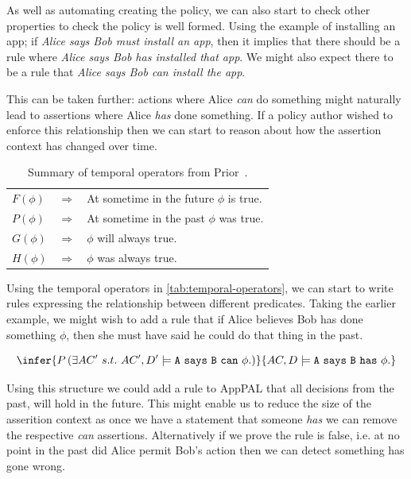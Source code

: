 \documentclass[thesis.tex]{subfiles}
\begin{document}
As well as automating creating the policy, we can also start to check other
properties to check the policy is well formed. Using the example of installing
an app; if \emph{Alice says Bob must install
  an app}, then it implies that there should be a rule where \emph{Alice says
Bob has installed that app}.  We might also expect there to be a rule that
\emph{Alice says Bob can install the app}.

This can be taken further: actions where Alice \emph{can} do something might
naturally lead to assertions where Alice \emph{has} done something.  If a policy
author wished to enforce this relationship then we can start to reason about how the
assertion context has changed over time.

\begin{table}\centering
  \begin{tabular}{l c l}
    \toprule
      $F(\phi)$ & $\Rightarrow$ & At sometime in the future $\phi$ is true. \\
      $P(\phi)$ & $\Rightarrow$ & At sometime in the past $\phi$ was true. \\
      $G(\phi)$ & $\Rightarrow$ & $\phi$ will always true. \\
      $H(\phi)$ & $\Rightarrow$ & $\phi$ was always true. \\
    \bottomrule
  \end{tabular}
  \caption{Summary of temporal operators from Prior~\cite{arthur_n._prior_past_1967}.}
  \label{tab:temporal-operators}
\end{table}

Using the temporal operators in \autoref{tab:temporal-operators}, we can start to write rules expressing the relationship between different predicates.
Taking the earlier example,  we might wish to add a rule that if Alice believes Bob has done something $\phi$, then she must have said he could do that thing in the past.

\begin{equation*}
  \infer{P\left(\exists AC^\prime~s.t.~AC^\prime, D^\prime \models \mathtt{A~says~B~can~\phi.}\right)}{%
    AC, D \models \mathtt{A~says~B~has~\phi.}}
\end{equation*}

Using this structure we could add a rule to AppPAL that all decisions from the past, will hold in the future.
This might enable us to reduce the size of the asserition context as once we have a statement that someone \emph{has} we can remove the respective \emph{can} assertions.
Alternatively if we prove the rule is false, i.e. at no point in the past did Alice permit Bob's action then we can detect something has gone wrong.
\end{document}
